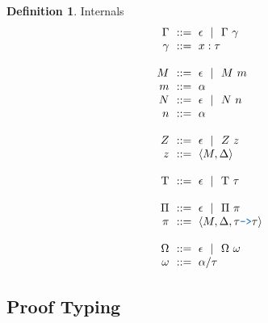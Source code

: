 \documentclass[acmsmall]{acmart}
\theoremstyle{definition}
\newtheorem{definition}{Definition}[section]
\begin{document}
\begin{definition} Internals 
  \label{definition:internals}
  \[\begin{array}[t]{r@{}l}
    \nonterm{\Gamma} & \is \epsilon \sep \Gamma\ \gamma
    \\
    \nonterm{\gamma} & \is x : \tau
    \\
    \\
    \nonterm{M} & \is \epsilon \sep M\ m
    \\
    \nonterm{m} & \is \alpha
    \\
    \nonterm{N} & \is \epsilon \sep N\ n
    \\
    \nonterm{n} & \is \alpha
    \\
    \\
    \nonterm{Z} & \is \epsilon \sep Z\ z
    \\
    \nonterm{z} & \is \left< M, \Delta \right>
    \\
    \\
    \nonterm{\Tau} & \is \epsilon \sep \Tau\ \tau
    \\
    \\
    \nonterm{\Pi} & \is \epsilon \sep \Pi\ \pi
    \\
    \nonterm{\pi} & \is \left< M, \Delta, \tau \obj{->} \tau\right>
    \\
    \\
    \nonterm{\Omega} & \is \epsilon \sep \Omega\ \omega
    \\  
    \nonterm{\omega} & \is \alpha \slash \tau
  \end{array}\]
\end{definition}


\subsection{Proof Typing}
\end{document}
